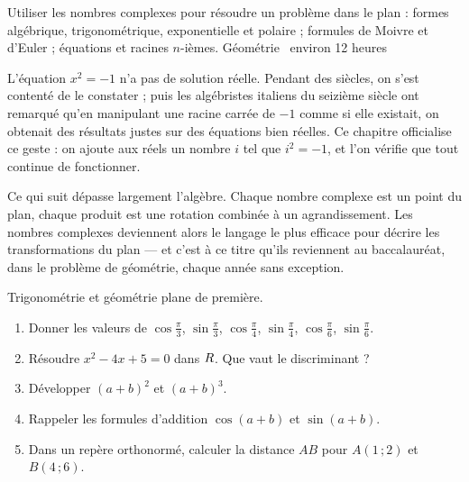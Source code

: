   {Utiliser les nombres complexes pour résoudre un problème dans le plan :
   formes algébrique, trigonométrique, exponentielle et polaire ; formules de
   Moivre et d'Euler ; équations et racines $n$-ièmes.}
  {Géométrie \textbullet\ environ 12 heures}

L'équation $x^{2} = -1$ n'a pas de solution réelle. Pendant des siècles, on
s'est contenté de le constater ; puis les algébristes italiens du seizième
siècle ont remarqué qu'en manipulant une racine carrée de $-1$ comme si elle
existait, on obtenait des résultats justes sur des équations bien réelles. Ce
chapitre officialise ce geste : on ajoute aux réels un nombre $i$ tel que
$i^{2} = -1$, et l'on vérifie que tout continue de fonctionner.

Ce qui suit dépasse largement l'algèbre. Chaque nombre complexe est un point
du plan, chaque produit est une rotation combinée à un agrandissement. Les
nombres complexes deviennent alors le langage le plus efficace pour décrire
les transformations du plan — et c'est à ce titre qu'ils reviennent au
baccalauréat, dans le problème de géométrie, chaque année sans exception.

\begin{revision}
Trigonométrie et géométrie plane de première.

\begin{enumerate}[label=\textbf{\arabic*.}, leftmargin=*, itemsep=0.35em]
  \item Donner les valeurs de $\cos\frac{\pi}{3}$, $\sin\frac{\pi}{3}$,
        $\cos\frac{\pi}{4}$, $\sin\frac{\pi}{4}$, $\cos\frac{\pi}{6}$,
        $\sin\frac{\pi}{6}$.
  \item Résoudre $x^{2}-4x+5 = 0$ dans $R$. Que vaut le discriminant ?
  \item Développer $(a+b)^{2}$ et $(a+b)^{3}$.
  \item Rappeler les formules d'addition
        $\cos(a+b)$ et $\sin(a+b)$.
  \item Dans un repère orthonormé, calculer la distance $AB$ pour
        $A(1\,;2)$ et $B(4\,;6)$.
\end{enumerate}
\end{revision}

